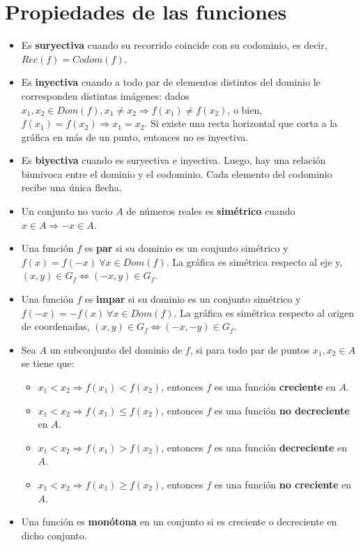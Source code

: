 \documentclass[11pt,a4paper]{article}
\begin{document}
\section{Propiedades de las funciones}
\begin{itemize}
\item Es \textbf{suryectiva} cuando su recorrido coincide con su codominio, es decir, $Rec(f) = Codom(f)$.
\item Es \textbf{inyectiva} cuando a todo par de elementos distintos del dominio le corresponden distintas im\'agenes: dados $x_1,x_2 \in Dom(f), x_1 \not = x_2 \Rightarrow f(x_1) \not = f(x_2)$, o bien, $f(x_1) = f(x_2) \Rightarrow x_1 = x_2$. Si existe una recta horizontal que corta a la gr\'afica en m\'as de un punto, entonces no es inyectiva.
\item Es \textbf{biyectiva} cuando es suryectiva e inyectiva. Luego, hay una relaci\'on biunivoca entre el dominio y el codominio. Cada elemento del codominio recibe una \'unica flecha.\\

\item Un conjunto no vacio $A$ de n\'umeros reales es \textbf{sim\'etrico} cuando $x \in A \Rightarrow -x \in A$.
\item Una funci\'on $f$ es \textbf{par} si su dominio es un conjunto sim\'etrico y $f(x) = f(-x)\ \forall x \in Dom(f)$. La gr\'afica es sim\'etrica respecto al eje y, $(x, y) \in G_f \iff (-x, y) \in G_f$.
\item Una funci\'on $f$ es \textbf{impar} si su dominio es un conjunto sim\'etrico y $f(-x) = -f(x)\ \forall x \in Dom(f)$. La gr\'afica es sim\'etrica respecto al origen de coordenadas, $(x,y) \in G_f \iff (-x,-y) \in G_f$.\\

\item Sea $A$ un subconjunto del dominio de $f$, si para todo par de puntos $x_1, x_2 \in A$ se tiene que:
\begin{itemize}
\item $x_1 < x_2 \Rightarrow f(x_1) < f(x_2)$, entonces $f$ es una funci\'on \textbf{creciente} en $A$.
\item $x_1 < x_2 \Rightarrow f(x_1) \leq f(x_2)$, entonces $f$ es una funci\'on \textbf{no decreciente} en $A$.
\item $x_1 < x_2 \Rightarrow f(x_1) > f(x_2)$, entonces $f$ es una funci\'on \textbf{decreciente} en $A$.
\item $x_1 < x_2 \Rightarrow f(x_1) \geq f(x_2)$, entonces $f$ es una funci\'on \textbf{no creciente} en $A$.
\end{itemize}
\item Una funci\'on es \textbf{mon\'otona} en un conjunto si es creciente o decreciente en dicho conjunto.
\end{itemize}
\end{document}
